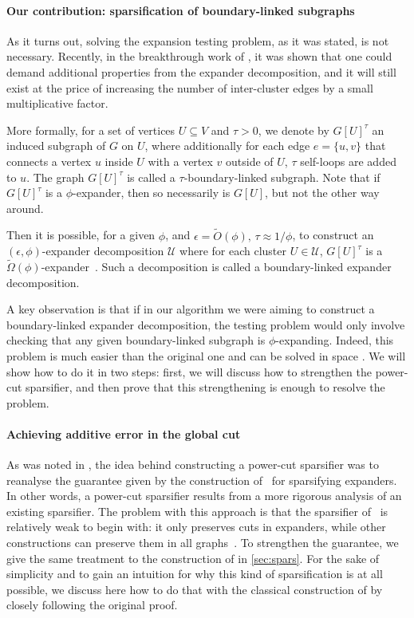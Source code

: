 \documentclass[epsfig,letter,11pt]{article}
\numberwithin{equation}{section}
\newcommand{\eps}{\epsilon}
\newcommand{\otil}{\tilde{O}}
\renewcommand{\tilde}{\widetilde}
\begin{document}
\paragraph*{Our contribution: sparsification of boundary-linked subgraphs}

As it turns out, solving the expansion testing problem, as it was stated, is not necessary. Recently, in the breakthrough work of \cite{boundlink}, it was shown that one could demand additional properties from the expander decomposition, and it will still exist at the price of increasing the number of inter-cluster edges by a small multiplicative factor.

More formally, for a set of vertices $U \subseteq V$ and $\tau > 0$, we denote by $G[U]^\tau$ an induced subgraph of $G$ on $U$, where additionally for each edge $e=\{u,v\}$ that connects a vertex $u$ inside $U$ with a vertex $v$ outside of $U$, $\tau$ self-loops are added to $u$. The graph $G[U]^\tau$ is called a $\tau$-boundary-linked subgraph. Note that if $G[U]^\tau$ is a $\phi$-expander, then so necessarily is $G[U]$, but not the other way around.


Then it is possible, for a given $\phi$, and $\eps = \otil(\phi), \, \tau \approx 1/\phi$, to construct an $(\eps, \phi)$-expander decomposition $\mathcal{U}$ where for each cluster $U \in \mathcal{U}$, $G[U]^\tau$ is a $ \widetilde{\Omega}(\phi)$-expander~\cite{boundlink}. Such a decomposition is called a boundary-linked expander decomposition.

A key observation is that if in our algorithm we were aiming to construct a boundary-linked expander decomposition, the testing problem would only involve checking that any given boundary-linked subgraph is $\phi$-expanding. Indeed, this problem is much easier than the original one and can be solved in space \smash{$\otil(n)$}. We will show how to do it in two steps: first, we will discuss how to strengthen the power-cut sparsifier, and then prove that this strengthening is enough to resolve the problem.

\paragraph*{Achieving additive error in the global cut}
As was noted in \cite{streamexpdec}, the idea behind constructing a power-cut sparsifier was to reanalyse the guarantee given by the construction of~\cite{stspectral} for sparsifying expanders. In other words, a power-cut sparsifier results from a more rigorous analysis of an existing sparsifier. The problem with this approach is that the sparsifier of~\cite{stspectral} is relatively weak to begin with: it only preserves cuts in expanders, while other constructions can preserve them in all graphs~\cite{benczurkarger,fungspars}.
To strengthen the guarantee, we give the same treatment to the construction of \cite{fungspars} in \cref{sec:spars}. For the sake of simplicity and to gain an intuition for why this kind of sparsification is at all possible, we discuss here how to do that with the classical construction of \cite{karger1994random} by closely following the original proof.
\end{document}

